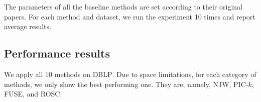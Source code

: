 The parameters of all the baseline methods are set according to their original papers.
For each method and dataset,
we run the experiment 10 times and report average results.

\subsection{Performance results}
\label{sec:results}

We apply all 10 methods on \textsc{DBLP}. 
Due to space limitations, for each category of methods, we only show the best performing one. 
They are, namely, NJW, PIC-$k$, FUSE, and ROSC. 
